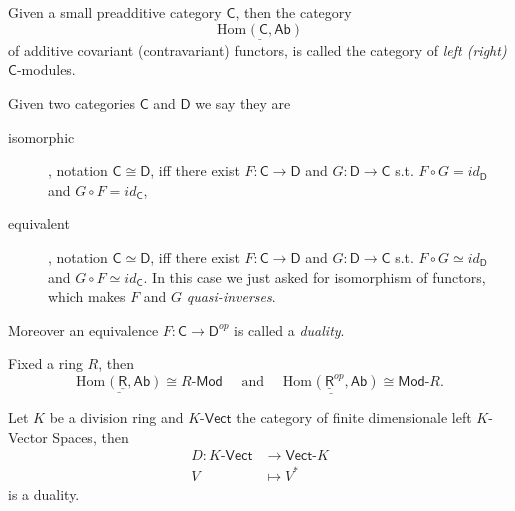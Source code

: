 \begin{defn}
	Given a small preadditive category $\mathsf{C}$, then the category
	\begin{equation}
		\underline{\mathrm{Hom}_{\mathsf{}} \left( \mathsf{C}, \mathsf{Ab} \right)}
	\end{equation} 
	of additive covariant (contravariant) functors, is called the category of {\em left (right) } $\mathsf{C}$-modules.
\end{defn}

\begin{defn}
	Given two categories $\mathsf{C}$ and $\mathsf{D}$ we say they are
	\begin{description}
		\item[isomorphic], notation $\mathsf{C} \cong \mathsf{D}$, iff there exist $F\colon \mathsf{C} \to \mathsf{D}$ and $G\colon \mathsf{D} \to \mathsf{C}$ s.t. $F \circ G = id_{\mathsf{D}}$ and $G \circ F = id_\mathsf{C}$,
		\item[equivalent], notation $\mathsf{C} \simeq \mathsf{D}$, iff there exist $F\colon \mathsf{C} \to \mathsf{D}$ and $G\colon \mathsf{D} \to \mathsf{C}$ s.t. $F \circ G \simeq id_{\mathsf{D}}$ and $G \circ F \simeq id_\mathsf{C}$.
			In this case we just asked for isomorphism of functors, which makes $F$ and $G$ {\em quasi-inverses}.
	\end{description} 

	Moreover an equivalence $F\colon \mathsf{C} \to \mathsf{D}^{op}$ is called a  {\em duality}.
\end{defn}

\begin{rem}
	Fixed a ring $R$, then 
	\begin{equation}
		\underline{\mathrm{Hom}_{\mathsf{}} \left( \underline{\mathsf{R}}, \mathsf{Ab} \right)} \cong R \text{-}\mathsf{Mod} 
		\quad \text{ and } \quad
		\underline{\mathrm{Hom}_{\mathsf{}} \left( \underline{\mathsf{R}}^{op}, \mathsf{Ab} \right)} \cong \mathsf{Mod}\text{-}R
	.\end{equation} 
\end{rem}

\begin{ex}[duality]
	Let $K$ be a division ring and $K$-$\mathsf{Vect}$ the category of finite dimensionale left $K$-Vector Spaces, then
	\begin{align}
		D\colon K \text{-}\mathsf{Vect} &\to \mathsf{Vect} \text{-}K \\
		V &\mapsto V^*
	\end{align} 
	is a duality.
\end{ex} 

